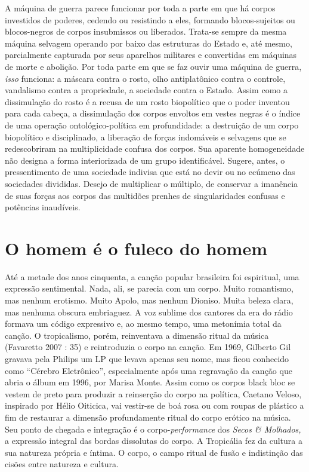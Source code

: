 A máquina de guerra parece funcionar por toda a parte em que há corpos
investidos de poderes, cedendo ou resistindo a eles, formando
blocos-sujeitos ou blocos-negros de corpos insubmissos ou liberados.
Trata-se sempre da mesma máquina selvagem operando por baixo das
estruturas do Estado e, até mesmo, parcialmente capturada por seus
aparelhos militares e convertidas em máquinas de morte e abolição. Por
toda parte em que se faz ouvir uma máquina de guerra, \emph{isso
}funciona: a máscara contra o rosto, olho antiplatônico contra o
controle, vandalismo contra a propriedade, a sociedade contra o Estado.
Assim como a dissimulação do rosto é a recusa de um rosto biopolítico
que o poder inventou para cada cabeça, a dissimulação dos corpos
envoltos em vestes negras é o índice de uma operação ontológico-política
em profundidade: a destruição de um corpo biopolítico e disciplinado, a
liberação de forças indomáveis e selvagens que se redescobriram na
multiplicidade confusa dos corpos. Sua aparente homogeneidade não
designa a forma interiorizada de um grupo identificável. Sugere, antes,
o pressentimento de uma sociedade indivisa que está no devir ou no
ecúmeno das sociedades divididas. Desejo de multiplicar o múltiplo, de
conservar a imanência de suas forças aos corpos das multidões prenhes de
singularidades confusas e potências inaudíveis.


\section{O homem é o fuleco do homem}

Até a metade dos anos cinquenta, a canção popular brasileira foi
espiritual, uma expressão sentimental. Nada, ali, se parecia com um
corpo. Muito romantismo, mas nenhum erotismo. Muito Apolo, mas nenhum
Dioniso. Muita beleza clara, mas nenhuma obscura embriaguez. A voz
sublime dos cantores da era do rádio formava um código expressivo e, ao
mesmo tempo, uma metonímia total da canção. O tropicalismo, porém,
reinventava a dimensão ritual da música (Favaretto 2007 : 35) e
reintroduzia o corpo na canção. Em 1969, Gilberto Gil gravava pela
Philips um LP que levava apenas seu nome, mas ficou conhecido como
``Cérebro Eletrônico'', especialmente após uma regravação da canção que
abria o álbum em 1996, por Marisa Monte. Assim como os corpos black bloc
se vestem de preto para produzir a reinserção do corpo na política,
Caetano Veloso, inspirado por Hélio Oiticica, vai vestir-se de boá rosa
ou com roupas de plástico a fim de restaurar a dimensão profundamente
ritual do corpo erótico na música. Seu ponto de chegada e integração é o
corpo-\emph{performance }dos \emph{Secos \& Molhados, }a expressão
integral das bordas dissolutas do corpo. A Tropicália fez da cultura a
sua natureza própria e íntima. O corpo, o campo ritual de fusão e
indistinção das cisões entre natureza e cultura.

